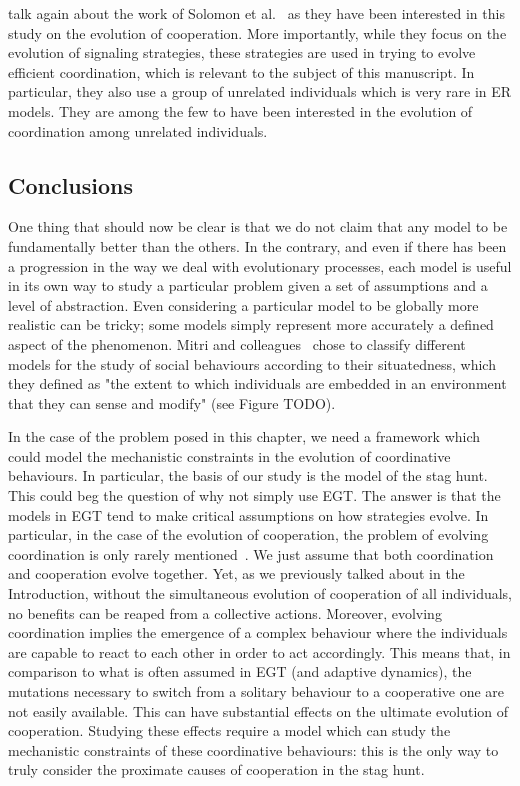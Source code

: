 talk again about the work of Solomon et al.~\cite{Solomon2012} as they have been interested in this study on the evolution of cooperation. More importantly, while they focus on the evolution of signaling strategies, these strategies are used in trying to evolve efficient coordination, which is relevant to the subject of this manuscript. In particular, they also use a group of unrelated individuals which is very rare in ER models. They are among the few to have been interested in the evolution of coordination among unrelated individuals. 


  \subsection{Conclusions}

    One thing that should now be clear is that we do not claim that any model to be fundamentally better than the others. In the contrary, and even if there has been a progression in the way we deal with evolutionary processes, each model is useful in its own way to study a particular problem given a set of assumptions and a level of abstraction. Even considering a particular model to be globally more realistic can be tricky; some models simply represent more accurately a defined aspect of the phenomenon. Mitri and colleagues~\cite{Mitri2012} chose to classify different models for the study of social behaviours according to their situatedness, which they defined as "the extent to which individuals are embedded in an environment that they can sense and modify" (see Figure TODO).

    In the case of the problem posed in this chapter, we need a framework which could model the mechanistic constraints in the evolution of coordinative behaviours. In particular, the basis of our study is the model of the stag hunt. This could beg the question of why not simply use EGT. The answer is that the models in EGT tend to make critical assumptions on how strategies evolve. In particular, in the case of the evolution of cooperation, the problem of evolving coordination is only rarely mentioned~\cite{Forber2015}. We just assume that both coordination and cooperation evolve together. Yet, as we previously talked about in the Introduction, without the simultaneous evolution of cooperation of all individuals, no benefits can be reaped from a collective actions. Moreover, evolving coordination implies the emergence of a complex behaviour where the individuals are capable to react to each other in order to act accordingly. This means that, in comparison to what is often assumed in EGT (and adaptive dynamics), the mutations necessary to switch from a solitary behaviour to a cooperative one are not easily available. This can have substantial effects on the ultimate evolution of cooperation. Studying these effects require a model which can study the mechanistic constraints of these coordinative behaviours: this is the only way to truly consider the proximate causes of cooperation in the stag hunt.

